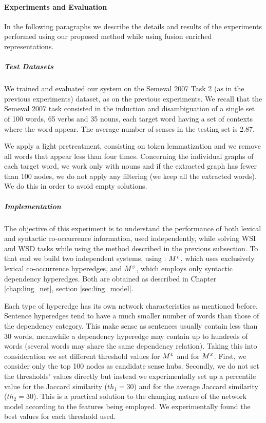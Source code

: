 	
\paragraph{Experiments and Evaluation}
In the following paragraphs we describe the details and results of the experiments performed using our proposed method while using fusion enriched representations.
\subparagraph{Test Datasets}
We trained and evaluated our system on the Semeval 2007 Task 2 (as in the previous experiments) dataset, as on the previous experiments. We recall that the Semeval 2007 task consisted in the induction and disambiguation of a single set of 100 words, 65 verbs and 35 nouns, each target word having a set of contexts where the word appear. The average number of senses in the testing set is 2.87. 


We apply a light pretreatment, consisting on token lemmatization and we remove all words that appear less than four times. Concerning the individual graphs of each target word, we work only with nouns and if the extracted graph has fewer than 100 nodes, we do not apply any filtering (we keep all the extracted words). We do this in order to avoid empty solutions.



\subparagraph{Implementation}
The objective of this experiment is to understand the performance of both lexical and syntactic co-occurrence information, used independently, while solving WSI and WSD tasks while using the method described in the previous subsection. To that end we build two independent systems, using : $M^{\scriptscriptstyle L}$, which uses exclusively lexical co-occurrence hyperedges, and $M^{\scriptscriptstyle S}$, which employs only syntactic dependency hyperedges. Both are obtained as described in Chapter \ref{chap:ling_net}, section \ref{sec:ling_model}.
 
Each type of hyperedge has its own network characteristics as mentioned before. Sentence hyperedges tend to have a much smaller number of words than those of the dependency category. This make sense as sentences usually contain less than 30 words, meanwhile a dependency hyperedge may contain up to hundreds of words (several words may share the same dependency relation). Taking this into consideration we set different threshold values for $M^{\scriptscriptstyle L}$ and for $M^{\scriptscriptstyle S}$. First, we  consider only the top 100 nodes as candidate sense hubs. Secondly, we do not set the thresholds' values directly but instead we experimentally set up a percentile value for the Jaccard similarity ($th_1=30$) and for the average Jaccard similarity ($th_2=30$). This is a practical solution to the changing nature of the network model according to the features being employed. We experimentally found the best values for  each threshold used.



